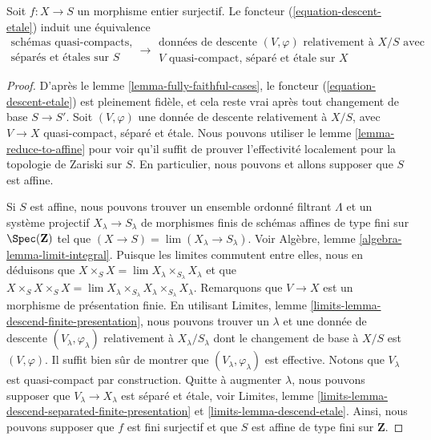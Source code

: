 \begin{proposition}
\label{proposition-effective}
Soit $f : X \to S$ un morphisme entier surjectif.
Le foncteur (\ref{equation-descent-etale}) induit une équivalence
$$
\begin{matrix}
\text{schémas quasi-compacts,}\\
\text{séparés et \'etales sur }S
\end{matrix}
\longrightarrow
\begin{matrix}
\text{données de descente }(V, \varphi)\text{ relativement à }X/S\text{ avec}\\
V\text{ quasi-compact, séparé et \'etale sur }X
\end{matrix}
$$
\end{proposition}

\begin{proof}
D'après le lemme \ref{lemma-fully-faithful-cases}, le
foncteur (\ref{equation-descent-etale})
est pleinement fidèle, et cela reste vrai après tout
changement de base $S \to S'$. Soit $(V, \varphi)$ une donnée de descente
relativement à $X/S$, avec $V \to X$ quasi-compact, séparé et \'etale.
Nous pouvons utiliser le lemme \ref{lemma-reduce-to-affine}
pour voir qu'il suffit de prouver l'effectivité
localement pour la topologie de Zariski sur $S$. En particulier, nous pouvons et allons
supposer que $S$ est affine.

\medskip\noindent
Si $S$ est affine, nous pouvons trouver un ensemble ordonné filtrant $\Lambda$ et
un système projectif $X_\lambda \to S_\lambda$
de morphismes finis de schémas affines de type fini sur
$\Spec(\mathbf{Z})$ tel que $(X \to S) = \lim (X_\lambda \to S_\lambda)$.
Voir Algèbre, lemme \ref{algebra-lemma-limit-integral}.
Puisque les limites commutent entre elles, nous en déduisons que
$X \times_S X = \lim X_\lambda \times_{S_\lambda} X_\lambda$
et que
$X \times_S X \times_S X = \lim
X_\lambda \times_{S_\lambda} X_\lambda \times_{S_\lambda} X_\lambda$.
Remarquons que $V \to X$ est un morphisme de présentation finie.
En utilisant Limites, lemme \ref{limits-lemma-descend-finite-presentation},
nous pouvons trouver un $\lambda$ et une donnée de descente $(V_\lambda, \varphi_\lambda)$
relativement à $X_\lambda/S_\lambda$ dont le changement de base à $X/S$ est
$(V, \varphi)$. Il suffit bien sûr de montrer que
$(V_\lambda, \varphi_\lambda)$ est effective. Notons que $V_\lambda$
est quasi-compact par construction.
Quitte à augmenter $\lambda$, nous pouvons supposer
que $V_\lambda \to X_\lambda$ est séparé et \'etale, voir
Limites, lemme \ref{limits-lemma-descend-separated-finite-presentation} et
\ref{limits-lemma-descend-etale}.
Ainsi, nous pouvons supposer que $f$ est fini surjectif et que
$S$ est affine de type fini sur $\mathbf{Z}$.


\end{proof}
